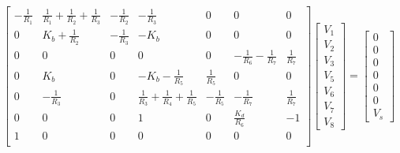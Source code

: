 \[
  \begin{bmatrix}
    - \frac{1}{R_1} & \frac{1}{R_1} + \frac{1}{R_2} + \frac{1}{R_3} & -\frac{1}{R_2} & -\frac{1}{R_3}                                & 0              & 0                              & 0             \\
    0               & K_b + \frac{1}{R_2}                           & -\frac{1}{R_3} & - K_b                                         & 0              & 0                              & 0             \\
    0               & 0                                             & 0              & 0                                             & 0              & -\frac{1}{R_6} - \frac{1}{R_7} & \frac{1}{R_7} \\
    0               & K_b                                           & 0              & -K_b - \frac{1}{R_5}                          & \frac{1}{R_5}  & 0                              & 0             \\
    0               & -\frac{1}{R_3}                                & 0              & \frac{1}{R_3} + \frac{1}{R_4} + \frac{1}{R_5} & -\frac{1}{R_5} & -\frac{1}{R_7}                 & \frac{1}{R_7} \\
    0               & 0                                             & 0              & 1                                             & 0              & \frac{K_d}{R_6}                & -1            \\
    1               & 0                                             & 0              & 0                                             & 0              & 0                              & 0             \\
  \end{bmatrix}
  \begin{bmatrix}
    V_1 \\ V_2  \\ V_3 \\ V_5 \\ V_6 \\ V_7 \\ V_8
  \end{bmatrix}
  =
  \begin{bmatrix}
    0 \\ 0 \\ 0 \\ 0 \\ 0  \\ 0 \\ V_s
  \end{bmatrix}
\]


